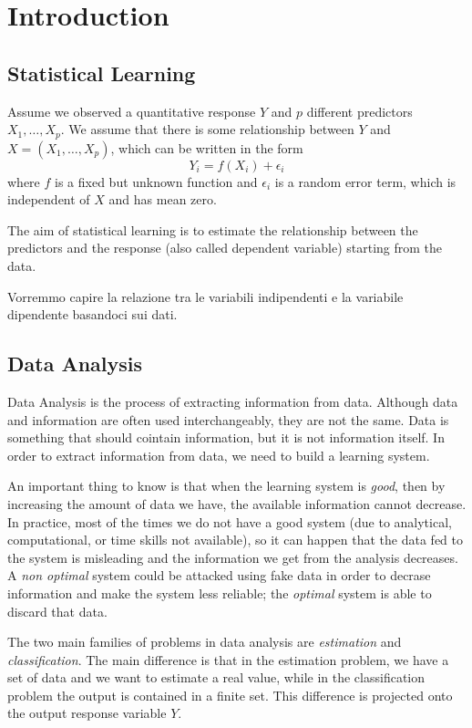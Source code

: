 \chapter*{Introduction}
\section*{Statistical Learning}
Assume we observed a quantitative response $Y$ and $p$ different predictors $X_1,\dots,X_p$. We assume that there is some relationship between $Y$ and $X=(X_1,\dots,X_p)$, which can be written in the form
$$
Y_i=f(X_i)+\epsilon_i
$$
where $f$ is a fixed but unknown function and $\epsilon_i$ is a random error term, which is independent of $X$ and has mean zero.  

The aim of statistical learning is to estimate the relationship between the predictors and the response (also called dependent variable) starting from the data.

Vorremmo capire la relazione tra le variabili indipendenti e la variabile dipendente basandoci sui dati.
\section*{Data Analysis}
Data Analysis is the process of extracting information from data. Although data and information are often used interchangeably, they are not the same. Data is something that should cointain information, but it is not information itself. In order to extract information from data, we need to build a learning system.

An important thing to know is that when the learning system is \textit{good}, then by increasing the amount of data we have, the available information cannot decrease. In practice, most of the times we do not have a good system (due to analytical, computational, or time skills not available), so it can happen that the data fed to the system is misleading and the information we get from the analysis decreases. A \textit{non optimal} system could be attacked using fake data in order to decrase information and make the system less reliable; the \textit{optimal} system is able to discard that data.

The two main families of problems in data analysis are \textit{estimation} and \textit{classification}. The main difference is that in the estimation problem,
we have a set of data and we want to estimate a real value, while in the classification problem the output is contained in a finite set. This difference is projected onto the output response variable $Y$.

